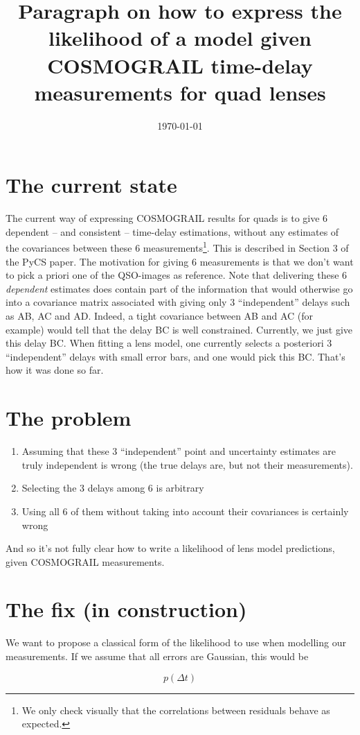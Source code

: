 \documentclass[12pt]{article}
\begin{document}
\title{Paragraph on how to express the likelihood of a model given COSMOGRAIL time-delay measurements for quad lenses}
\date{\today}
\maketitle


\section{The current state}

The current way of expressing COSMOGRAIL results for quads is to give 6 dependent -- and consistent -- time-delay estimations, without any estimates of the covariances between these 6 measurements\footnote{We only check visually that the correlations between residuals behave as expected.}. This is described in Section 3 of the PyCS paper. The motivation for giving 6 measurements is that we don't want to pick a priori one of the QSO-images as reference. Note that delivering these 6 \emph{dependent} estimates does contain part of the information that would otherwise go into a covariance matrix associated with giving only 3 ``independent'' delays such as AB, AC and AD. Indeed, a tight covariance between AB and AC (for example) would tell that the delay BC is well constrained. Currently, we just give this delay BC. When fitting a lens model, one currently selects a posteriori 3 ``independent'' delays with small error bars, and one would pick this BC. That's how it was done so far.

\section{The problem}

\begin{enumerate}
\item Assuming that these 3 ``independent'' point and uncertainty estimates are truly independent is wrong (the true delays are, but not their measurements). 
\item Selecting the 3 delays among 6 is arbitrary
\item Using all 6 of them without taking into account their covariances is certainly wrong
\end{enumerate}

And so it's not fully clear how to write a likelihood of lens model predictions, given COSMOGRAIL measurements.

\section{The fix (in construction)}

We want to propose a classical form of the likelihood to use when modelling our measurements. If we assume that all errors are Gaussian, this would be


\begin{equation}
p(\Delta t)
\end{equation}
\end{document}
